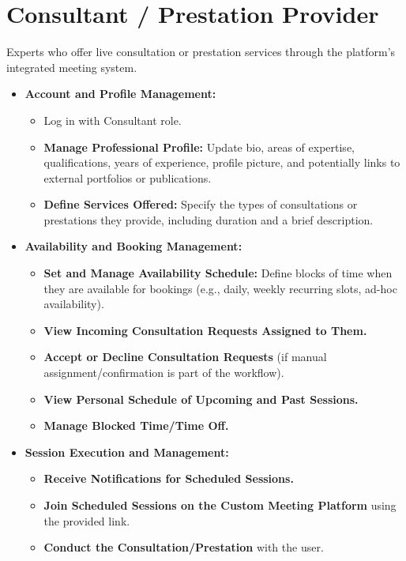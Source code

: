 \documentclass[12pt, a4paper]{report} %
\begin{document}
\section{Consultant / Prestation Provider}
Experts who offer live consultation or prestation services through the platform's integrated meeting system.
  \begin{itemize}
    \item \textbf{Account and Profile Management:}
        \begin{itemize}
            \item Log in with Consultant role.
            \item \textbf{Manage Professional Profile:} Update bio, areas of expertise, qualifications, years of experience, profile picture, and potentially links to external portfolios or publications.
            \item \textbf{Define Services Offered:} Specify the types of consultations or prestations they provide, including duration and a brief description.
        \end{itemize}
    \item \textbf{Availability and Booking Management:}
        \begin{itemize}
            \item \textbf{Set and Manage Availability Schedule:} Define blocks of time when they are available for bookings (e.g., daily, weekly recurring slots, ad-hoc availability).
            \item \textbf{View Incoming Consultation Requests Assigned to Them.}
            \item \textbf{Accept or Decline Consultation Requests} (if manual assignment/confirmation is part of the workflow).
            \item \textbf{View Personal Schedule of Upcoming and Past Sessions.}
            \item \textbf{Manage Blocked Time/Time Off.}
        \end{itemize}
    \item \textbf{Session Execution and Management:}
        \begin{itemize}
            \item \textbf{Receive Notifications for Scheduled Sessions.}
            \item \textbf{Join Scheduled Sessions on the Custom Meeting Platform} using the provided link.
            \item \textbf{Conduct the Consultation/Prestation} with the user.

\end{itemize}
\end{itemize}
\end{document}
